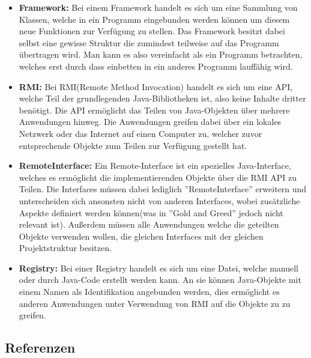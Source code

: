 \documentclass[fontsize=12pt,paper=a4,twoside]{scrartcl}
\begin{document}
\begin{itemize}
\item \textbf{Framework:} Bei einem Framework handelt es sich um eine Sammlung von Klassen, welche in ein Programm eingebunden werden können um diesem neue Funktionen zur Verfügung zu stellen. Das Framework besitzt dabei selbst eine gewisse Struktur die zumindest teilweise auf das Programm übertragen wird. Man kann es also vereinfacht als ein Programm betrachten, welches erst durch dass einbetten in ein anderes Programm lauffähig wird.
\item \textbf{RMI:} Bei RMI(Remote Method Invocation) handelt es sich um eine API, welche Teil der grundlegenden Java-Bibliotheken ist, also keine Inhalte dritter benötigt. Die API ermöglicht das Teilen von Java-Objekten über mehrere Anwendungen hinweg. Die Anwendungen greifen dabei über ein lokales Netzwerk oder das Internet auf einen Computer zu, welcher zuvor entsprechende Objekte zum Teilen zur Verfügung gestellt hat.
\item \textbf{RemoteInterface:} Ein Remote-Interface ist ein spezielles Java-Interface, welches es ermöglicht die implementierenden Objekte über die RMI API zu Teilen. Die Interfaces müssen dabei lediglich ''RemoteInterface'' erweitern und unterscheiden sich ansonsten nicht von anderen Interfaces, wobei zusätzliche Aspekte definiert werden können(was in ''Gold and Greed'' jedoch nicht relevant ist). Außerdem müssen alle Anwendungen welche die geteilten Objekte verwenden wollen, die gleichen Interfaces mit der gleichen Projektstruktur besitzen.
\item \textbf{Registry:} Bei einer Registry handelt es sich um eine Datei, welche manuell oder durch Java-Code erstellt werden kann. An sie können Java-Objekte mit einem Namen als Identifikation angebunden werden, dies ermöglicht es anderen Anwendungen unter Verwendung von RMI auf die Objekte zu zu greifen. 
\end{itemize}

\subsection{Referenzen}
\end{document}
